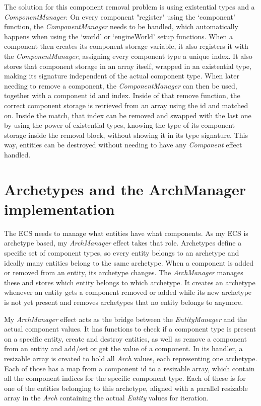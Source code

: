 The solution for this component removal problem is using existential types and a \textit{ComponentManager}. On every component "register" using the `component' function, the \textit{ComponentManager} needs to be handled, which automatically happens when using the `world' or `engineWorld' setup functions. When a component then creates its component storage variable, it also registers it with the \textit{ComponentManager}, assigning every component type a unique index. It also stores that component storage in an array itself, wrapped in an existential type, making its signature independent of the actual component type. When later needing to remove a component, the \textit{ComponentManager} can then be used, together with a component id and index. Inside of that remove function, the correct component storage is retrieved from an array using the id and matched on. Inside the match, that index can be removed and swapped with the last one by using the power of existential types, knowing the type of its component storage inside the removal block, without showing it in its type signature. This way, entities can be destroyed without needing to have any \textit{Component} effect handled.

\section{Archetypes and the ArchManager implementation}

The ECS needs to manage what entities have what components. As my ECS is archetype based, my \textit{ArchManager} effect takes that role. Archetypes define a specific set of component types, so every entity belongs to an archetype and ideally many entities belong to the same archetype. When a component is added or removed from an entity, its archetype changes. The \textit{ArchManager} manages these and stores which entity belongs to which archetype. It creates an archetype whenever an entity gets a component removed or added while its new archetype is not yet present and removes archetypes that no entity belongs to anymore.

My \textit{ArchManager} effect acts as the bridge between the \textit{EntityManager} and the actual component values. It has functions to check if a component type is present on a specific entity, create and destroy entities, as well as remove a component from an entity and add/set or get the value of a component. In its handler, a resizable array is created to hold all \textit{Arch} values, each representing one archetype. Each of those has a map from a component id to a resizable array, which contain all the component indices for the specific component type. Each of these is for one of the entities belonging to this archetype, aligned with a parallel resizable array in the \textit{Arch} containing the actual \textit{Entity} values for iteration.

